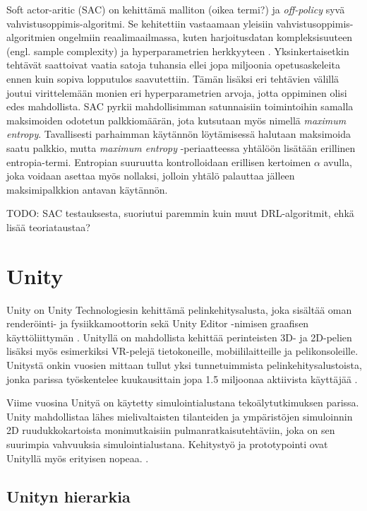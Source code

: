 \documentclass[utf8]{gradu3}
\begin{document}
Soft actor-aritic (SAC) on \cite{haarnoja2018soft} kehittämä malliton (oikea termi?) ja \textit{off-policy} syvä vahvistusoppimis-algoritmi. Se kehitettiin vastaamaan yleisiin vahvistusoppimis-algoritmien ongelmiin reaalimaailmassa, kuten harjoitusdatan kompleksisuuteen (engl. sample complexity) ja hyperparametrien herkkyyteen \parencite{haarnoja2018app}. Yksinkertaisetkin tehtävät saattoivat vaatia satoja tuhansia ellei jopa miljoonia opetusaskeleita ennen kuin sopiva lopputulos saavutettiin. Tämän lisäksi eri tehtävien välillä joutui virittelemään monien eri hyperparametrien arvoja, jotta oppiminen olisi edes mahdollista. SAC pyrkii mahdollisimman satunnaisiin toimintoihin samalla maksimoiden odotetun palkkiomäärän, jota kutsutaan myös nimellä \textit{maximum entropy}. Tavallisesti parhaimman käytännön löytämisessä halutaan maksimoida saatu palkkio, mutta \textit{maximum entropy} -periaatteessa yhtälöön lisätään erillinen entropia-termi. Entropian suuruutta kontrolloidaan erillisen kertoimen $\alpha$ avulla, joka voidaan asettaa myös nollaksi, jolloin yhtälö palauttaa jälleen maksimipalkkion antavan käytännön.

TODO: SAC testauksesta, suoriutui paremmin kuin muut DRL-algoritmit, ehkä lisää teoriataustaa?

\chapter{Unity}

Unity on Unity Technologiesin kehittämä pelinkehitysalusta, joka sisältää oman renderöinti- ja fysiikkamoottorin sekä Unity Editor -nimisen graafisen käyttöliittymän \parencite{juliani2018unity}. Unityllä on mahdollista kehittää perinteisten 3D- ja 2D-pelien lisäksi myös esimerkiksi VR-pelejä tietokoneille, mobiililaitteille ja pelikonsoleille. Unitystä onkin vuosien mittaan tullut yksi tunnetuimmista pelinkehitysalustoista, jonka parissa työskentelee kuukausittain jopa 1.5 miljoonaa aktiivista käyttäjää \parencite{unityweb}.

Viime vuosina Unityä on käytetty simulointialustana tekoälytutkimuksen parissa. Unity mahdollistaa lähes mielivaltaisten tilanteiden ja ympäristöjen simuloinnin 2D ruudukkokartoista monimutkaisiin pulmanratkaisutehtäviin, joka on sen suurimpia vahvuuksia simulointialustana. Kehitystyö ja prototypointi ovat Unityllä myös erityisen nopeaa. \parencite{juliani2018unity}.

\section{Unityn hierarkia}
\end{document}
